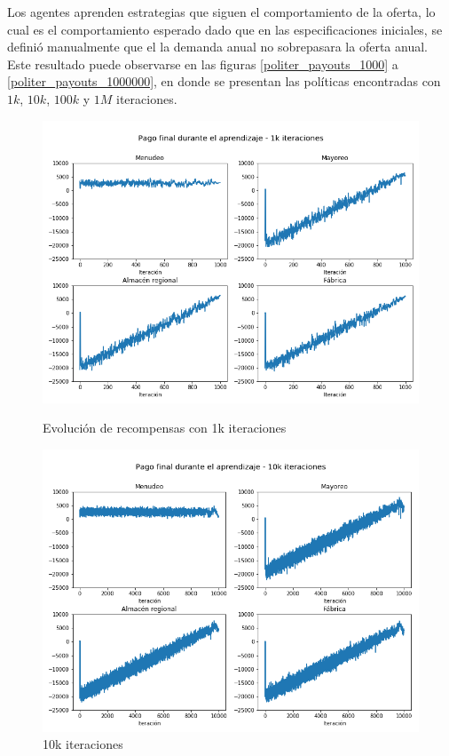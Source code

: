 Los agentes aprenden estrategias que siguen el comportamiento de la oferta, lo cual es el comportamiento esperado dado que en las especificaciones iniciales, se defini\'o manualmente que el la demanda anual no sobrepasara la oferta anual. Este resultado puede observarse en las figuras \ref{politer_payouts_1000} a \ref{politer_payouts_1000000}, en donde se presentan las pol\'iticas encontradas con $1k$, $10k$, $100k$ y $1M$ iteraciones. \\

\begin{figure}[!htb]
   \begin{minipage}{0.48\textwidth}
     \centering
     \includegraphics[width=1\linewidth]{tesis_tex/figs/policyiteration_payouts_1000.png}
     \caption{Evoluci\'on de recompensas con 1k iteraciones}\label{politer_payouts_1000}
   \end{minipage}\hfill
   \begin{minipage}{0.48\textwidth}
     \centering
     \includegraphics[width=1\linewidth]{tesis_tex/figs/policyiteration_payouts_10000.png}
     \caption{10k iteraciones}\label{politer_payouts_10000}
   \end{minipage}
\end{figure}

